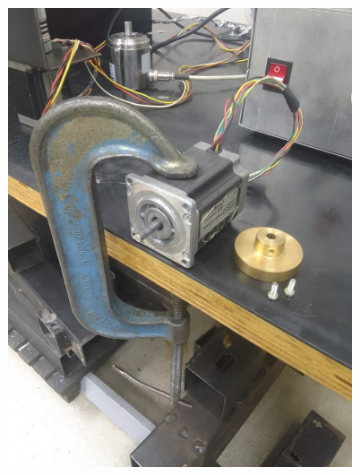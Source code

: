 \begin{figure}[H]
    \centering
    \begin{subfigure}{0.35\textwidth}
        \includegraphics[width=\textwidth]{images/Eletrica/Figura1a.png}
    \end{subfigure}
    \begin{subfigure}{0.35\textwidth}

\end{subfigure}
\end{figure}
